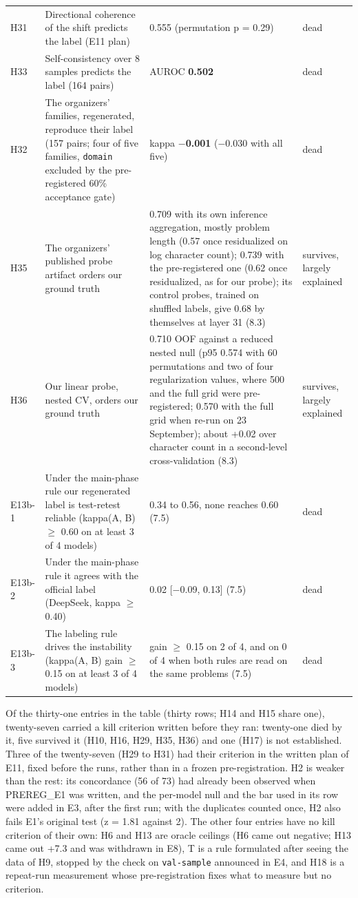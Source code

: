 {\begin{longtable}{L{1.1cm}L{3.7cm}L{5.7cm}L{2.2cm}}
H31 & Directional coherence of the shift predicts the label (E11 plan) & 0.555 (permutation p = 0.29) & dead \\
H33 & Self-consistency over 8 samples predicts the label (164 pairs) & AUROC \textbf{0.502} & dead \\
H32 & The organizers' families, regenerated, reproduce their label (157 pairs; four of five families, \texttt{domain} excluded by the pre-registered 60\% acceptance gate) & kappa \textbf{$-$0.001} ($-$0.030 with all five) & dead \\
H35 & The organizers' published probe artifact orders our ground truth & 0.709 with its own inference aggregation, mostly problem length (0.57 once residualized on log character count); 0.739 with the pre-registered one (0.62 once residualized, as for our probe); its control probes, trained on shuffled labels, give 0.68 by themselves at layer 31 (8.3) & survives, largely explained \\
H36 & Our linear probe, nested CV, orders our ground truth & 0.710 OOF against a reduced nested null (p95 0.574 with 60 permutations and two of four regularization values, where 500 and the full grid were pre-registered; 0.570 with the full grid when re-run on 23 September); about +0.02 over character count in a second-level cross-validation (8.3) & survives, largely explained \\
E13b-1 & Under the main-phase rule our regenerated label is test-retest reliable (kappa(A, B) $\geq$ 0.60 on at least 3 of 4 models) & 0.34 to 0.56, none reaches 0.60 (7.5) & dead \\
E13b-2 & Under the main-phase rule it agrees with the official label (DeepSeek, kappa $\geq$ 0.40) & 0.02 [$-$0.09, 0.13] (7.5) & dead \\
E13b-3 & The labeling rule drives the instability (kappa(A, B) gain $\geq$ 0.15 on at least 3 of 4 models) & gain $\geq$ 0.15 on 2 of 4, and on 0 of 4 when both rules are read on the same problems (7.5) & dead \\
\end{longtable}
}

Of the thirty-one entries in the table (thirty rows; H14 and H15 share one), twenty-seven carried a kill criterion written before they ran: twenty-one died by it, five survived it (H10, H16, H29, H35, H36) and one (H17) is not established. Three of the twenty-seven (H29 to H31) had their criterion in the written plan of E11, fixed before the runs, rather than in a frozen pre-registration. H2 is weaker than the rest: its concordance (56 of 73) had already been observed when PREREG\_E1 was written, and the per-model null and the bar used in its row were added in E3, after the first run; with the duplicates counted once, H2 also fails E1's original test (z = 1.81 against 2). The other four entries have no kill criterion of their own: H6 and H13 are oracle ceilings (H6 came out negative; H13 came out +7.3 and was withdrawn in E8), T is a rule formulated after seeing the data of H9, stopped by the check on \texttt{val-sample} announced in E4, and H18 is a repeat-run measurement whose pre-registration fixes what to measure but no criterion.

